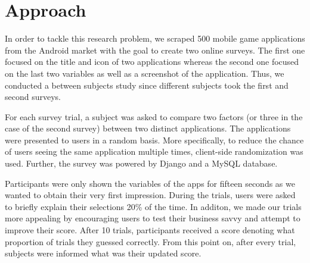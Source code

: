 \section{Approach}

In order to tackle this research problem, we scraped 500 mobile game applications from the Android market with the goal to create two online surveys. The first one focused on the title and icon of two applications whereas the second one focused on the last two variables as well as a screenshot of the application. Thus, we conducted a between subjects study since different subjects took the first and second surveys.

For each survey trial, a subject was asked to compare two factors (or three in the case of the second survey) between two distinct applications. The applications were presented to users in a random basis. More specifically, to reduce the chance of users seeing the same application multiple times, client-side randomization was used. Further, the survey was powered by Django and a MySQL database.

Participants were only shown the variables of the apps for fifteen seconds as we wanted to obtain their very first impression. During the trials, users were asked to briefly explain their selections 20\% of the time. In additon, we made our trials more appealing by encouraging users to test their business savvy and attempt to improve their score. After 10 trials, participants received a score denoting what proportion of trials they guessed correctly. From this point on, after every trial, subjects were informed what was their updated score.